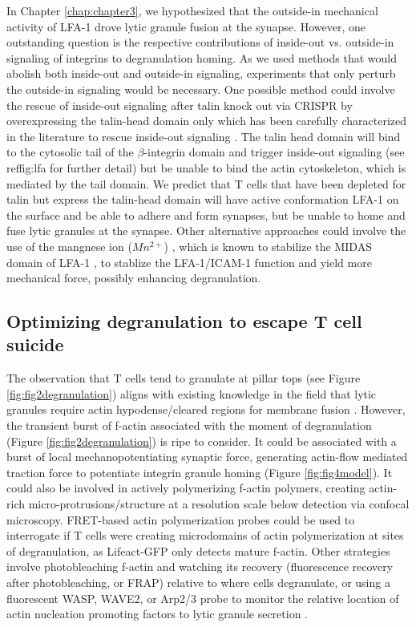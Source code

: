 In Chapter \ref{chap:chapter3}, we hypothesized that the outside-in mechanical activity of LFA-1 drove lytic granule fusion at the synapse. However, one outstanding question is the respective contributions of inside-out vs. outside-in signaling of integrins to degranulation homing. As we used methods that would abolish both inside-out and outside-in signaling, experiments that only perturb the outside-in signaling would be necessary. One possible method could involve the rescue of inside-out signaling after talin knock out via CRISPR by overexpressing the talin-head domain only which has been carefully characterized in the literature to rescue inside-out signaling \cite{Ciobanasu2018, Elliott2010, Ellis2014}. The talin head domain will bind to the cytosolic tail of the $\beta$-integrin domain and trigger inside-out signaling (see ref{fig:lfa} for further detail) but be unable to bind the actin cytoskeleton, which is mediated by the tail domain. We predict that T cells that have been depleted for talin but express the talin-head domain will have active conformation LFA-1 on the surface and be able to adhere and form synapses, but be unable to home and fuse lytic granules at the synapse. Other alternative approaches could involve the use of the mangnese ion ($Mn^{2+}$) , which is known to stabilize the MIDAS domain of LFA-1 \cite{Meijne1994, Sen2018, Dixit2011}, to stablize the LFA-1/ICAM-1 function and yield more mechanical force, possibly enhancing degranulation.

\subsection{Optimizing degranulation to escape T cell suicide}
The observation that T cells tend to granulate at pillar tops (see Figure \ref{fig:fig2degranulation}) aligns with existing knowledge in the field that lytic granules require actin hypodense/cleared regions for membrane fusion \cite{Ritter2015}.  However, the transient burst of f-actin associated with the moment of degranulation (Figure \ref{fig:fig2degranulation}) is ripe to consider.  It could be associated with a burst of local mechanopotentiating synaptic force,  generating actin-flow mediated traction force to potentiate integrin granule homing (Figure \ref{fig:fig4model}). It could also be involved in actively polymerizing f-actin polymers, creating actin-rich micro-protrusions/structure at a resolution scale below detection via confocal microscopy. FRET-based actin polymerization probes could be used to interrogate if T cells were creating microdomains of actin polymerization at sites of degranulation,  as Lifeact-GFP only detects mature f-actin.  Other strategies involve photobleaching f-actin and watching its recovery (fluorescence recovery after photobleaching, or FRAP) \cite{Simon1988} relative to where cells degranulate, or using a fluorescent WASP, WAVE2, or Arp2/3 probe to monitor the relative location of actin nucleation promoting factors to lytic granule secretion \cite{Obino2016, Tamzalit2018}. 

